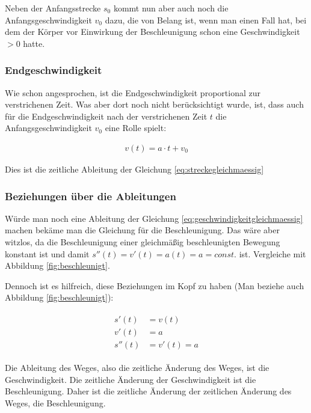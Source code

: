 \noindent Neben der Anfangsstrecke $s_0$ kommt nun aber auch noch die Anfangsgeschwindigkeit $v_0$ dazu, die von Belang ist, wenn man einen Fall hat, bei dem der Körper vor Einwirkung der Beschleunigung schon eine Geschwindigkeit $>0$ hatte.


\subsubsection{Endgeschwindigkeit}

Wie schon angesprochen, ist die Endgeschwindigkeit proportional zur verstrichenen Zeit. Was aber dort noch nicht berücksichtigt wurde, ist, dass auch für die Endgeschwindigkeit nach der verstrichenen Zeit $t$ die Anfangsgeschwindigkeit $v_0$ eine Rolle spielt:

\begin{align}	\label{eq:geschwindigkeitgleichmaessig}
	v(t) = a \cdot t + v_0
\end{align}

\noindent Dies ist die zeitliche Ableitung der Gleichung \ref{eq:streckegleichmaessig}


\subsubsection{Beziehungen über die Ableitungen}

Würde man noch eine Ableitung der Gleichung \ref{eq:geschwindigkeitgleichmaessig} machen bekäme man die Gleichung für die Beschleunigung. Das wäre aber witzlos, da die Beschleunigung einer gleichmäßig beschleunigten Bewegung konstant ist und damit $s''(t)=v'(t)=a(t)=a= const.$ ist. Vergleiche mit Abbildung \ref{fig:beschleunigt}.

Dennoch ist es hilfreich, diese Beziehungen im Kopf zu haben (Man beziehe auch Abbildung \ref{fig:beschleunigt}):

\begin{align}
\begin{split}
	s'(t) &= v(t) \\
	v'(t) &= a \\
	s''(t) &= v'(t)= a
\end{split}
\end{align}

\noindent Die Ableitung des Weges, also die zeitliche Änderung des Weges, ist die Geschwindigkeit. Die zeitliche Änderung der Geschwindigkeit ist die Beschleunigung. Daher ist die zeitliche Änderung der zeitlichen Änderung des Weges, die Beschleunigung.



